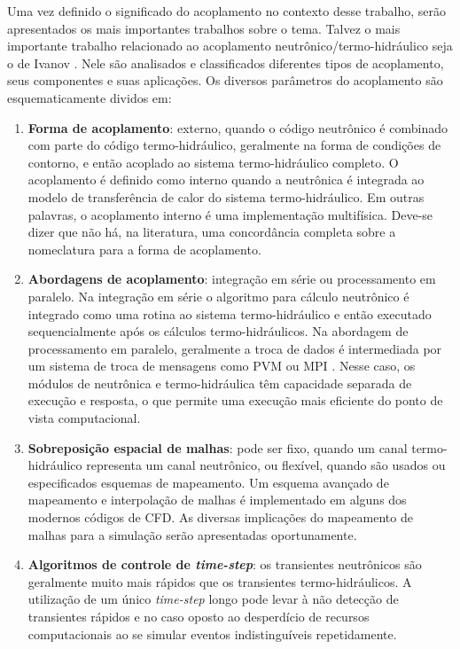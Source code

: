 Uma vez definido o significado do acoplamento no contexto desse trabalho, serão apresentados os mais importantes 
trabalhos sobre o tema. Talvez o mais importante trabalho relacionado ao acoplamento 
neutrônico/termo-hidráulico seja o de Ivanov \cite{Ivanov2007}. Nele são analisados e classificados diferentes tipos de 
acoplamento, seus componentes e suas aplicações. Os diversos parâmetros do acoplamento são esquematicamente dividos em: 
\begin{enumerate}
\item \textbf{Forma de acoplamento}: externo, quando o código neutrônico é combinado com parte do código termo-hidráulico, 
geralmente na forma de condições de contorno, e então acoplado ao sistema termo-hidráulico completo. O acoplamento 
é definido como interno quando a neutrônica é integrada ao modelo de transferência de calor do sistema termo-hidráulico. 
Em outras palavras, o acoplamento interno é uma implementação multifísica. Deve-se dizer que não há, na literatura, uma
concordância completa sobre a nomeclatura para a forma de acoplamento. 
\item \textbf{Abordagens de acoplamento}: integração em série ou processamento em paralelo. Na integração em série o algoritmo 
para cálculo neutrônico é integrado como uma rotina ao sistema termo-hidráulico e então executado sequencialmente 
após os cálculos termo-hidráulicos. Na abordagem de processamento em paralelo, geralmente a troca de dados é 
intermediada por um sistema de troca de mensagens como PVM \cite{Geist94} ou MPI \cite{Quinn2004}. Nesse caso, os 
módulos de neutrônica e termo-hidráulica têm capacidade separada de execução e resposta, o que permite uma execução 
mais eficiente do ponto de vista computacional.
\item \textbf{Sobreposição espacial de malhas}: pode ser fixo, quando um canal termo-hidráulico representa um canal neutrônico, 
ou flexível, quando são usados ou especificados esquemas de mapeamento. Um esquema avançado de mapeamento 
e interpolação de malhas \cite{Beaudoin2008} é implementado em alguns dos modernos códigos de CFD. As diversas implicações 
do mapeamento de malhas para a simulação serão apresentadas oportunamente.
\item \textbf{Algoritmos de controle de \textit{time-step}}: os transientes neutrônicos são geralmente muito mais rápidos que 
os transientes termo-hidráulicos. A utilização de um único \textit{time-step} longo pode levar à não detecção de transientes 
rápidos e no caso oposto ao desperdício de recursos computacionais ao se simular eventos indistinguíveis repetidamente.

\end{enumerate}
